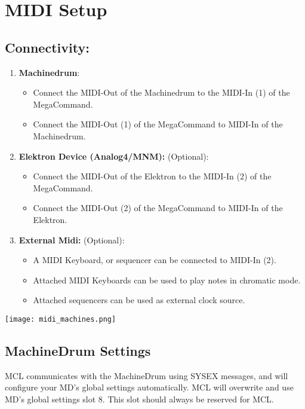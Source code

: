\chapter{MIDI Setup}
\section{Connectivity:}

\begin{enumerate}
\item\textbf{Machinedrum}:
\begin{itemize}
    \item Connect the MIDI-Out of the Machinedrum to the MIDI-In (1) of the MegaCommand.
    \item Connect the MIDI-Out (1) of the MegaCommand to MIDI-In of the Machinedrum.
\end{itemize}

\item\textbf{Elektron Device (Analog4/MNM):} (Optional):
\begin{itemize}
    \item Connect the MIDI-Out of the Elektron to the MIDI-In (2) of the MegaCommand. 
    \item Connect the MIDI-Out (2) of the MegaCommand to MIDI-In of the Elektron.
\end{itemize}

\item\textbf{External Midi:} (Optional): 
\begin{itemize}
    \item A MIDI Keyboard, or sequencer can be connected to MIDI-In (2). 
    \item Attached MIDI Keyboards can be used to play notes in chromatic mode.
    \item Attached sequencers can be used as external clock source.
\end{itemize}

\end{enumerate}
\texttt{[image: midi\_machines.png]}
\\
\newpage
\section{MachineDrum Settings }

MCL communicates with the MachineDrum using SYSEX messages, and will configure your MD's global settings automatically. MCL will overwrite and use MD's global settings slot 8. This slot should always be reserved for MCL.

